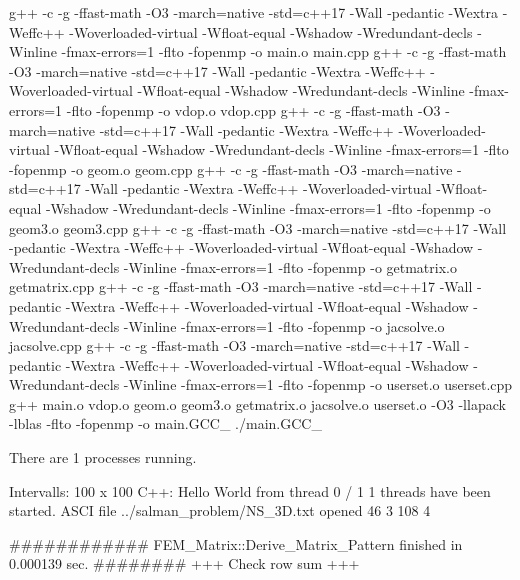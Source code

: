 g++ -c -g -ffast-math -O3 -march=native -std=c++17 -Wall -pedantic -Wextra -Weffc++ -Woverloaded-virtual -Wfloat-equal -Wshadow -Wredundant-decls -Winline -fmax-errors=1  -flto -fopenmp -o main.o main.cpp
g++ -c -g -ffast-math -O3 -march=native -std=c++17 -Wall -pedantic -Wextra -Weffc++ -Woverloaded-virtual -Wfloat-equal -Wshadow -Wredundant-decls -Winline -fmax-errors=1  -flto -fopenmp -o vdop.o vdop.cpp
g++ -c -g -ffast-math -O3 -march=native -std=c++17 -Wall -pedantic -Wextra -Weffc++ -Woverloaded-virtual -Wfloat-equal -Wshadow -Wredundant-decls -Winline -fmax-errors=1  -flto -fopenmp -o geom.o geom.cpp
g++ -c -g -ffast-math -O3 -march=native -std=c++17 -Wall -pedantic -Wextra -Weffc++ -Woverloaded-virtual -Wfloat-equal -Wshadow -Wredundant-decls -Winline -fmax-errors=1  -flto -fopenmp -o geom3.o geom3.cpp
g++ -c -g -ffast-math -O3 -march=native -std=c++17 -Wall -pedantic -Wextra -Weffc++ -Woverloaded-virtual -Wfloat-equal -Wshadow -Wredundant-decls -Winline -fmax-errors=1  -flto -fopenmp -o getmatrix.o getmatrix.cpp
g++ -c -g -ffast-math -O3 -march=native -std=c++17 -Wall -pedantic -Wextra -Weffc++ -Woverloaded-virtual -Wfloat-equal -Wshadow -Wredundant-decls -Winline -fmax-errors=1  -flto -fopenmp -o jacsolve.o jacsolve.cpp
g++ -c -g -ffast-math -O3 -march=native -std=c++17 -Wall -pedantic -Wextra -Weffc++ -Woverloaded-virtual -Wfloat-equal -Wshadow -Wredundant-decls -Winline -fmax-errors=1  -flto -fopenmp -o userset.o userset.cpp
g++  main.o vdop.o geom.o geom3.o getmatrix.o jacsolve.o userset.o  -O3  -llapack -lblas -flto -fopenmp -o main.GCC_
./main.GCC_

 There are 1 processes running.
 
Intervalls: 100 x 100
C++: Hello World from thread 0 / 1
   1   threads have been started.
ASCI file  ../salman_problem/NS_3D.txt  opened
46  3  108  4

############   FEM_Matrix::Derive_Matrix_Pattern finished in  0.000139 sec.    ########
+++  Check row sum  +++

